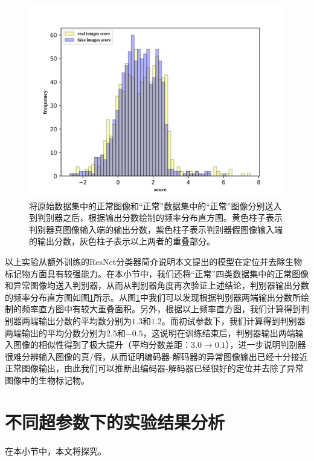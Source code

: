 \begin{figure}[h]
	\centering
	\includegraphics[width=1.0\textwidth]{figure/simulated_skin_score_distribution.png}
	\caption{将原始数据集中的正常图像和“正常”数据集中的“正常”图像分别送入到判别器之后，根据输出分数绘制的频率分布直方图。黄色柱子表示判别器真图像输入端的输出分数，紫色柱子表示判别器假图像输入端的输出分数，灰色柱子表示以上两者的重叠部分。}
	\label{fig:simulated_skin_hist_freq}
\end{figure}

以上实验从额外训练的ResNet分类器简介说明本文提出的模型在定位并去除生物标记物方面具有较强能力。在本小节中，我们还将“正常”四类数据集中的正常图像和异常图像均送入判别器，从而从判别器角度再次验证上述结论，判别器输出分数的频率分布直方图如图\ref{fig:simulated_skin_hist_freq}所示。从图\ref{fig:simulated_skin_hist_freq}中我们可以发现根据判别器两端输出分数所绘制的频率直方图中有较大重叠面积。另外，根据以上频率直方图，我们计算得到判别器两端输出分数的平均数分别为$1.3 $和$1.2$。而初试参数下，我们计算得到判别器两端输出的平均分数分别为$2.5$和$-0.5$，这说明在训练结束后，判别器输出两端输入图像的相似性得到了极大提升（平均分数差距：$3.0\rightarrow 0.1$），进一步说明判别器很难分辨输入图像的真/假，从而证明编码器-解码器的异常图像输出已经十分接近正常图像输出，由此我们可以推断出编码器-解码器已经很好的定位并去除了异常图像中的生物标记物。

\section{不同超参数下的实验结果分析}\label{sec:multi_classes_hyper_paras}
在本小节中，本文将探究。


